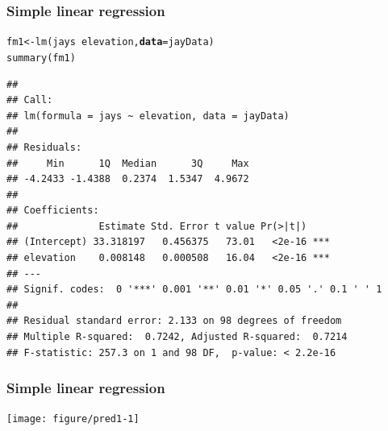 \documentclass[color=usenames,dvipsnames]{beamer}\usepackage[]{graphicx}\usepackage[]{color}
\makeatletter
\newcommand{\hlopt}[1]{\textcolor[rgb]{0,0,0}{#1}}%
\newcommand{\hlstd}[1]{\textcolor[rgb]{0,0,0}{#1}}%
\newcommand{\hlkwb}[1]{\textcolor[rgb]{0,0.341,0.682}{#1}}%
\newcommand{\hlkwc}[1]{\textcolor[rgb]{0,0,0}{\textbf{#1}}}%
\newcommand{\hlkwd}[1]{\textcolor[rgb]{0.004,0.004,0.506}{#1}}%
\newenvironment{kframe}{%
 \def\at@end@of@kframe{}%
 \ifinner\ifhmode%
  \def\at@end@of@kframe{\end{minipage}}%
  \begin{minipage}{\columnwidth}%
 \fi\fi%
 \def\FrameCommand##1{\hskip\@totalleftmargin \hskip-\fboxsep
 \colorbox{shadecolor}{##1}\hskip-\fboxsep
     \hskip-\linewidth \hskip-\@totalleftmargin \hskip\columnwidth}%
 \MakeFramed {\advance\hsize-\width
   \@totalleftmargin\z@ \linewidth\hsize
   \@setminipage}}%
 {\par\unskip\endMakeFramed%
 \at@end@of@kframe}
\newenvironment{knitrout}{}{} %
\makeatother
\begin{document}
\begin{frame}[fragile]
  \frametitle{Simple linear regression}
\begin{knitrout}\scriptsize
{}\color{fgcolor}\begin{kframe}
\begin{alltt}
\hlstd{fm1} \hlkwb{<-} \hlkwd{lm}\hlstd{(jays} \hlopt{~} \hlstd{elevation,} \hlkwc{data}\hlstd{=jayData)}
\hlkwd{summary}\hlstd{(fm1)}
\end{alltt}
\begin{verbatim}
## 
## Call:
## lm(formula = jays ~ elevation, data = jayData)
## 
## Residuals:
##     Min      1Q  Median      3Q     Max 
## -4.2433 -1.4388  0.2374  1.5347  4.9672 
## 
## Coefficients:
##              Estimate Std. Error t value Pr(>|t|)    
## (Intercept) 33.318197   0.456375   73.01   <2e-16 ***
## elevation    0.008148   0.000508   16.04   <2e-16 ***
## ---
## Signif. codes:  0 '***' 0.001 '**' 0.01 '*' 0.05 '.' 0.1 ' ' 1
## 
## Residual standard error: 2.133 on 98 degrees of freedom
## Multiple R-squared:  0.7242,	Adjusted R-squared:  0.7214 
## F-statistic: 257.3 on 1 and 98 DF,  p-value: < 2.2e-16
\end{verbatim}
\end{kframe}
\end{knitrout}
\end{frame}


\begin{frame}[fragile]
  \frametitle{Simple linear regression}
\begin{knitrout}
\color{fgcolor}
\texttt{[image: figure/pred1-1]} 

\end{knitrout}
\end{frame}
\end{document}
